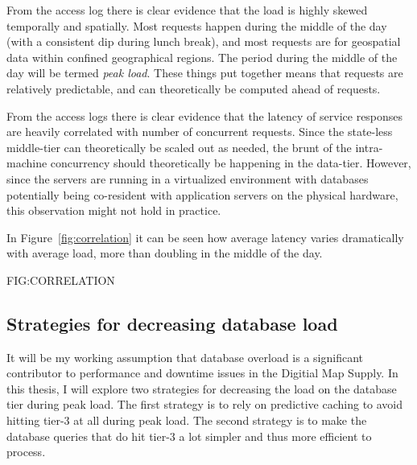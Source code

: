From the access log there is clear evidence that the load is highly skewed temporally and spatially. Most requests happen during the middle of the day (with a consistent dip during lunch break), and most requests are for geospatial data within confined geographical regions. The period during the middle of the day will be termed \emph{peak load}. These things put together means that requests are relatively predictable, and can theoretically be computed ahead of requests.

From the access logs there is clear evidence that the latency of service responses are heavily correlated with number of concurrent requests. Since the state-less middle-tier can theoretically be scaled out as needed, the brunt of the intra-machine concurrency should theoretically be happening in the data-tier. However, since the servers are running in a virtualized environment with databases potentially being co-resident with application servers on the physical hardware, this observation might not hold in practice.

In Figure~\ref{fig:correlation} it can be seen how average latency varies dramatically with average load, more than doubling in the middle of the day.

FIG:CORRELATION

\subsection{Strategies for decreasing database load}
It will be my working assumption that database overload is a significant contributor to performance and downtime issues in the Digitial Map Supply. In this thesis, I will explore two strategies for decreasing the load on the database tier during peak load. The first strategy is to rely on predictive caching to avoid hitting tier-3 at all during peak load. The second strategy is to make the database queries that do hit tier-3 a lot simpler and thus more efficient to process.
